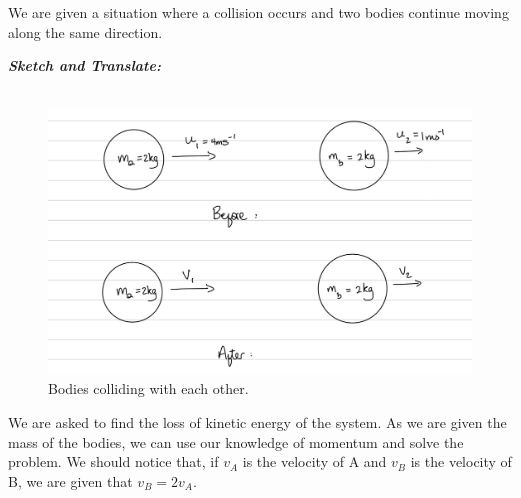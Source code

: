 %
%
%

\begin{subquestions}
	
\subquestion


\begin{subsubquestions}
	
\subsubquestion

We are given a situation where a collision occurs and two bodies continue moving along the same direction.

\textbf{\textit{Sketch and Translate:}} \\ \\
\begin{figure}[H]
	\begin{center}
		\includegraphics[scale=0.25]{../2007/figures/2008Mq5-1}
		\caption{\label{2008M:q5:Sketch1} Bodies colliding with each other.}
	\end{center}
\end{figure}	
We are asked to find the loss of kinetic energy of the system. As we are given the mass of the bodies, we can use our knowledge of momentum and solve the problem. We should notice that, if $v_A$ is the velocity of A and $v_B$ is the velocity of B, we are given that $v_B=2v_A$.




\end{subsubquestions}
\end{subquestions}
